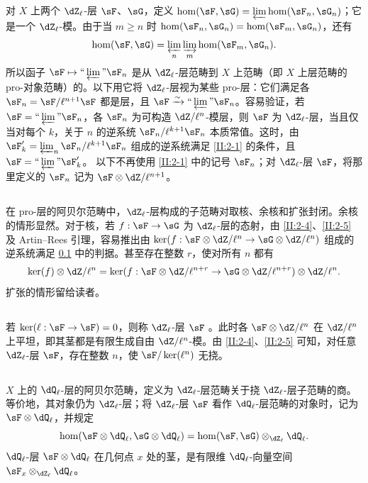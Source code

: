 \subsection{}\label{II:2-6}
对 $X$ 上两个 $\dZ_\ell$-层 $\sF$、$\sG$，定义 $\hom(\sF,\sG)=\varprojlim\hom(\sF_n,\sG_n)$；它是一个 $\dZ_\ell$-模。由于当 $m\geqslant n$ 时 $\hom(\sF_n,\sG_n)=\hom(\sF_m,\sG_n)$，还有
\[\hom(\sF,\sG)=\varprojlim_n\varinjlim_m\hom(\sF_m,\sG_n).\]
所以函子 $\sF\mapsto\text{``}\varprojlim\text{''}\sF_n$ 是从 $\dZ_\ell$-层范畴到 $X$ 上范畴（即 $X$ 上层范畴的 pro-对象范畴）的。以下用它将 $\dZ_\ell$-层视为某些 pro-层：它们满足各 $\sF_n=\sF/\ell^{n+1}\sF$ 都是层，且 $\sF\iso\text{``}\varprojlim\text{''}\sF_n$。容易验证，若 $\sF=\text{``}\varprojlim\text{''}\sF_n$，各 $\sF_n$ 为可构造 $\dZ/\ell^n$-模层，则 $\sF$ 为 $\dZ_\ell$-层，当且仅当对每个 $k$，关于 $n$ 的逆系统 $\sF_n/\ell^{k+1}\sF_n$ 本质常值。这时，由 $\sF'_k=\varprojlim_n\sF_n/\ell^{k+1}\sF_n$ 组成的逆系统满足 \ref{II:2-1} 的条件，且 $\sF=\text{``}\varprojlim\text{''}\sF'_k$。
以下不再使用 \ref{II:2-1} 中的记号 $\sF_n$；对 $\dZ_\ell$-层 $\sF$，将那里定义的 $\sF_n$ 记为 $\sF\otimes\dZ/\ell^{n+1}$。

\subsection{}\label{II:2-7}
在 pro-层的阿贝尔范畴中，$\dZ_\ell$-层构成的子范畴对取核、余核和扩张封闭。余核的情形显然。对于核，若 $f:\sF\to\sG$ 为 $\dZ_\ell$-层的态射，由 \ref{II:2-4}、\ref{II:2-5} 及 Artin--Rees 引理，容易推出由 $\ker(f:\sF\otimes\dZ/\ell^n\to\sG\otimes\dZ/\ell^n)$ 组成的逆系统满足 \ref{II:2-6} 中的判据。甚至存在整数 $r$，使对所有 $n$ 都有
\[\ker(f)\otimes\dZ/\ell^n=\ker(f:\sF\otimes\dZ/\ell^{n+r}\to\sG\otimes\dZ/\ell^{n+r})\otimes\dZ/\ell^n.\]
扩张的情形留给读者。

\subsection{}\label{II:2-8}
若 $\ker(\ell:\sF\to\sF)=0$，则称 $\dZ_\ell$-层 $\sF$ 。此时各 $\sF\otimes\dZ/\ell^n$ 在 $\dZ/\ell^n$ 上平坦，即其茎都是有限生成自由 $\dZ/\ell^n$-模。由 \ref{II:2-4}、\ref{II:2-5} 可知，对任意 $\dZ_\ell$-层 $\sF$，存在整数 $n$，使 $\sF/\ker(\ell^n)$ 无挠。

\subsection{}\label{II:2-9}
$X$ 上的 $\dQ_\ell$-层的阿贝尔范畴，定义为 $\dZ_\ell$-层范畴关于挠 $\dZ_\ell$-层子范畴的商。等价地，其对象仍为 $\dZ_\ell$-层；将 $\dZ_\ell$-层 $\sF$ 看作 $\dQ_\ell$-层范畴的对象时，记为 $\sF\otimes\dQ_\ell$，并规定
\[\hom(\sF\otimes\dQ_\ell,\sG\otimes\dQ_\ell)=\hom(\sF,\sG)\otimes_{\dZ_\ell}\dQ_\ell.\]
$\dQ_\ell$-层 $\sF\otimes\dQ_\ell$ 在几何点 $x$ 处的茎，是有限维 $\dQ_\ell$-向量空间 $\sF_x\otimes_{\dZ_\ell}\dQ_\ell$。

